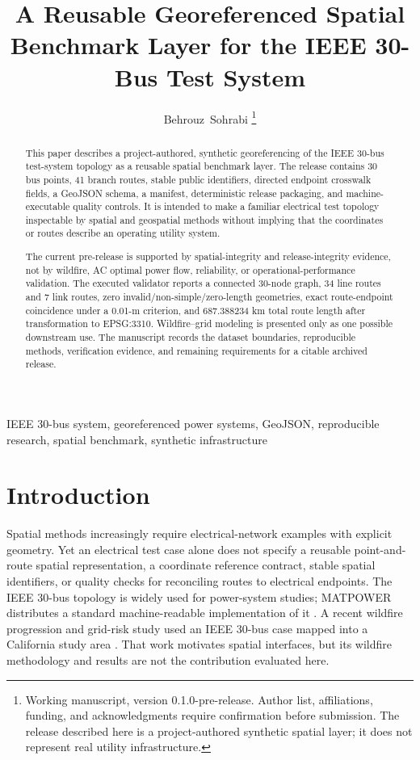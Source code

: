\documentclass[10pt,journal]{IEEEtran}
\title{A Reusable Georeferenced Spatial Benchmark Layer for the IEEE 30-Bus Test System}
\author{Behrouz~Sohrabi%
\thanks{Working manuscript, version 0.1.0-pre-release. Author list, affiliations, funding, and acknowledgments require confirmation before submission. The release described here is a project-authored synthetic spatial layer; it does not represent real utility infrastructure.}}
\begin{document}
\maketitle

\begin{abstract}
This paper describes a project-authored, synthetic georeferencing of the IEEE 30-bus test-system topology as a reusable spatial benchmark layer. The release contains 30 bus points, 41 branch routes, stable public identifiers, directed endpoint crosswalk fields, a GeoJSON schema, a manifest, deterministic release packaging, and machine-executable quality controls. It is intended to make a familiar electrical test topology inspectable by spatial and geospatial methods without implying that the coordinates or routes describe an operating utility system.

The current pre-release is supported by spatial-integrity and release-integrity evidence, not by wildfire, AC optimal power flow, reliability, or operational-performance validation. The executed validator reports a connected 30-node graph, 34 line routes and 7 link routes, zero invalid/non-simple/zero-length geometries, exact route-endpoint coincidence under a 0.01-m criterion, and 687.388234 km total route length after transformation to EPSG:3310. Wildfire--grid modeling is presented only as one possible downstream use. The manuscript records the dataset boundaries, reproducible methods, verification evidence, and remaining requirements for a citable archived release.
\end{abstract}

\begin{IEEEkeywords}
IEEE 30-bus system, georeferenced power systems, GeoJSON, reproducible research, spatial benchmark, synthetic infrastructure
\end{IEEEkeywords}

\section{Introduction}
Spatial methods increasingly require electrical-network examples with explicit geometry. Yet an electrical test case alone does not specify a reusable point-and-route spatial representation, a coordinate reference contract, stable spatial identifiers, or quality checks for reconciling routes to electrical endpoints. The IEEE 30-bus topology is widely used for power-system studies; MATPOWER distributes a standard machine-readable implementation of it \cite{zimmerman2011matpower}. A recent wildfire progression and grid-risk study used an IEEE 30-bus case mapped into a California study area \cite{sohrabi2024wildfire}. That work motivates spatial interfaces, but its wildfire methodology and results are not the contribution evaluated here.
\end{document}
